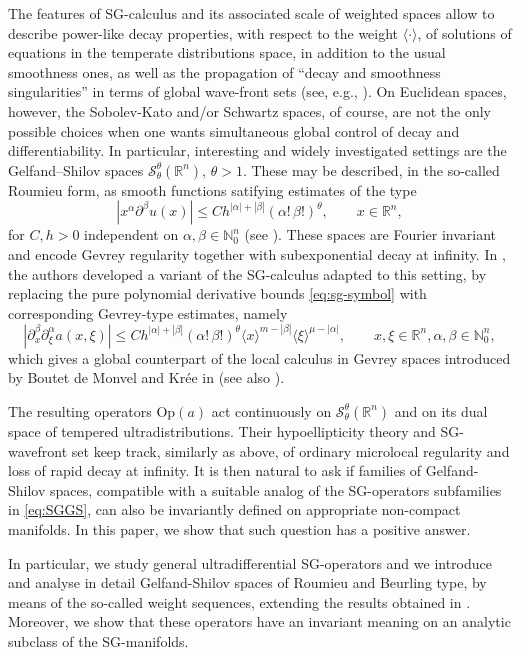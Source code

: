 \documentclass[11pt,reqno]{amsart}
\numberwithin{equation}{section}
\newcommand{\R}{{\mathbb{R}}} %
\newcommand{\N}{{\mathbb{N}}} %
\newcommand{\Op}{{\mathrm{Op}}}
\begin{document}
The features of SG-calculus and its associated scale of weighted spaces allow to describe power-like decay properties, with respect to the weight $\langle\cdot\rangle$,
of solutions of equations in the temperate distributions space, 
in addition to the usual smoothness ones, as well as the propagation of ``decay and smoothness singularities'' in terms of global wave-front sets 
(see, e.g., \cite{CM2013,CJT_2016,Melrose_GST}). On Euclidean spaces, however, the Sobolev-Kato and/or Schwartz spaces, of course, are not the 
only possible choices when one wants simultaneous 
global control of decay and differentiability.  In particular, interesting and widely investigated settings are the Gelfand--Shilov spaces $\mathcal{S}_\theta^\theta(\R^n)$, $\theta>1$.
These may be described, in the so-called Roumieu form, as smooth functions satifying estimates of the type
%
\[
  |x^\alpha\partial^\beta u(x)|\leq C h^{|\alpha|+|\beta|}(\alpha!\,\beta!)^\theta,
  \qquad x\in\R^n,
\]
%
for $C,h>0$ independent on $\alpha,\beta\in\N_0^n$ (see  \cite{GelfandShilov1968}). These spaces are Fourier invariant and encode Gevrey regularity together with subexponential decay at infinity.  
In \cite{CapRod2006}, the authors developed a variant of the SG-calculus adapted to this setting, by replacing the pure polynomial derivative bounds 
\eqref{eq:sg-symbol} with corresponding Gevrey-type estimates, namely
%
\begin{equation}\label{eq:SGGS}
  |\partial_x^\beta\partial_\xi^\alpha a(x,\xi)|
  \leq C h^{|\alpha|+|\beta|}(\alpha!\,\beta!)^\theta
       \langle x\rangle^{m-|\beta|}\langle \xi\rangle^{\mu-|\alpha|},
  	\qquad x,\xi\in\R^n, \alpha,\beta\in\N^n_0,
\end{equation}
which gives a global counterpart of the local calculus in Gevrey spaces introduced by Boutet de Monvel and Kr\'ee in \cite{BMK1967} (see also \cite{Rod_Gevrey}).

The resulting operators $\Op(a)$ act continuously on $\mathcal{S}_\theta^\theta(\R^n)$ and on its dual space of tempered ultradistributions. 
Their hypoellipticity theory and SG-wavefront set 
keep track, similarly as above, of ordinary microlocal regularity and loss of rapid decay at infinity. It is then natural to ask if families of Gelfand-Shilov spaces,
compatible with a suitable analog of the SG-operators subfamilies in \eqref{eq:SGGS}, can also be invariantly defined on appropriate non-compact manifolds.
In this paper, we show that such question has a positive answer.

In particular, we study general ultradifferential SG-operators and we introduce and analyse in detail Gelfand-Shilov spaces of Roumieu and Beurling type, by means of the so-called weight sequences, extending the results obtained in \cite{CapRod2006}. Moreover, we show that these operators have an invariant meaning on an analytic subclass of the SG-manifolds.
\end{document}
